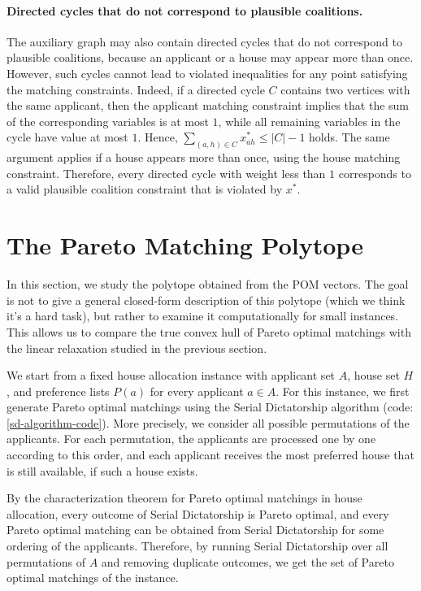 \documentclass[12pt]{report}
\numberwithin{algorithm}{chapter}
\begin{document}
	\paragraph{Directed cycles that do not correspond to plausible coalitions.} The auxiliary graph may also contain directed cycles that do not correspond to plausible coalitions, because an applicant or a house may appear more than once. However, such cycles cannot lead to violated inequalities for any point satisfying the matching constraints. Indeed, if a directed cycle $C$ contains two vertices with the same applicant, then the applicant matching constraint implies that the sum of the corresponding variables is at most $1$, while all remaining variables in the cycle have value at most $1$. Hence, $\sum_{(a,h)\in C} x^*_{ah}\leq |C|-1$ holds.
	The same argument applies if a house appears more than once, using the house matching constraint. Therefore, every directed cycle with weight less than $1$ corresponds to a valid plausible coalition constraint that is violated by $x^*$.


\section{The Pareto Matching Polytope}

	In this section, we study the polytope obtained from the POM vectors. The goal is not to give a general closed-form description of this polytope (which we think it's a hard task), but rather to examine it computationally for small instances. This allows us to compare the true convex hull of Pareto optimal matchings with the linear relaxation studied in the previous section.
	
	We start from a fixed house allocation instance with applicant set $A$, house set $H$, and preference lists $P(a)$ for every applicant $a\in A$. For this instance, we first generate Pareto optimal matchings using the Serial Dictatorship algorithm (code: \eqref{sd-algorithm-code}). More precisely, we consider all possible permutations of the applicants. For each permutation, the applicants are processed one by one according to this order, and each applicant receives the most preferred house that is still available, if such a house exists.
	
	By the characterization theorem {\cite[Chapter 6, pp. 13-14]{abraham2004pareto}} for Pareto optimal matchings in house allocation, every outcome of Serial Dictatorship is Pareto optimal, and every Pareto optimal matching can be obtained from Serial Dictatorship for some ordering of the applicants. Therefore, by running Serial Dictatorship over all permutations of $A$ and removing duplicate outcomes, we get the set of Pareto optimal matchings of the instance.
	
\end{document}
